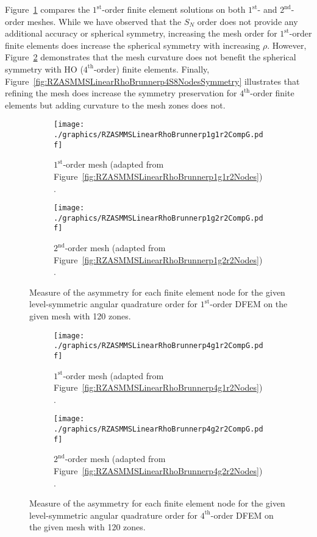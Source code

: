 \documentclass[12pt]{article}
\begin{document}
Figure~\ref{fig:RZASMMSLinearRhoBrunnerp1r2NodesSymmetry} compares the $1^\text{st}$-order finite element solutions on both $1^\text{st}$- and $2^\text{nd}$-order meshes. While we have observed that the $S_N$ order does not provide any additional accuracy or spherical symmetry, increasing the mesh order for $1^\text{st}$-order finite elements does increase the spherical symmetry with increasing $\rho$. However, Figure~\ref{fig:RZASMMSLinearRhoBrunnerp4r2NodesSymmetry}
 demonstrates that the mesh curvature does not benefit the spherical symmetry with HO ($4^\text{th}$-order) finite elements. Finally, Figure~\ref{fig:RZASMMSLinearRhoBrunnerp4S8NodesSymmetry} illustrates that refining the mesh does increase the symmetry preservation for $4^\text{th}$-order finite elements but adding curvature to the mesh zones does not.

\begin{figure}[!htb]
\centering
\begin{subfigure}{0.48\textwidth}
\centering
\texttt{[image: ./graphics/RZASMMSLinearRhoBrunnerp1g1r2CompG.pdf]}
\caption{$1^\text{st}$-order mesh (adapted from Figure~\ref{fig:RZASMMSLinearRhoBrunnerp1g1r2Nodes}).}
\end{subfigure}%
\hspace{0.04\textwidth}%
\begin{subfigure}{0.48\textwidth}
\centering
\texttt{[image: ./graphics/RZASMMSLinearRhoBrunnerp1g2r2CompG.pdf]}
\caption{$2^\text{nd}$-order mesh (adapted from Figure~\ref{fig:RZASMMSLinearRhoBrunnerp1g2r2Nodes}).}
\end{subfigure}
\caption{Measure of the asymmetry for each finite element node for the given level-symmetric angular quadrature order for $1^\text{st}$-order DFEM on the given mesh with 120 zones.}
\label{fig:RZASMMSLinearRhoBrunnerp1r2NodesSymmetry}
\end{figure}

\begin{figure}[!htb]
\centering
\begin{subfigure}{0.48\textwidth}
\centering
\texttt{[image: ./graphics/RZASMMSLinearRhoBrunnerp4g1r2CompG.pdf]}
\caption{$1^\text{st}$-order mesh (adapted from Figure~\ref{fig:RZASMMSLinearRhoBrunnerp4g1r2Nodes}).}
\end{subfigure}%
\hspace{0.04\textwidth}%
\begin{subfigure}{0.48\textwidth}
\centering
\texttt{[image: ./graphics/RZASMMSLinearRhoBrunnerp4g2r2CompG.pdf]}
\caption{$2^\text{nd}$-order mesh (adapted from Figure~\ref{fig:RZASMMSLinearRhoBrunnerp4g2r2Nodes}).}
\end{subfigure}
\caption{Measure of the asymmetry for each finite element node for the given level-symmetric angular quadrature order for $4^\text{th}$-order DFEM on the given mesh with 120 zones.}
\label{fig:RZASMMSLinearRhoBrunnerp4r2NodesSymmetry}
\end{figure}
\end{document}
